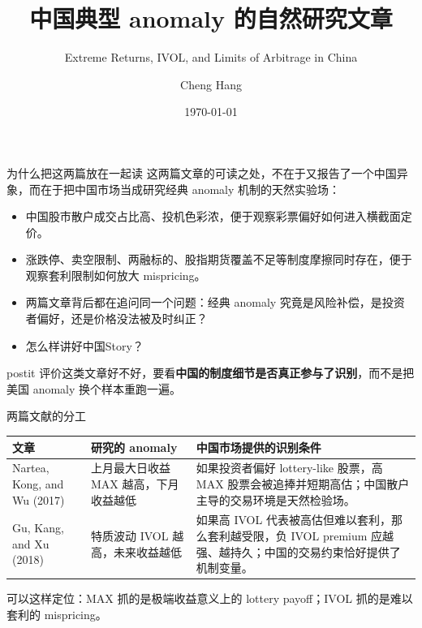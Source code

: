 \documentclass[aspectratio=169,10pt]{beamer}
\title[China Anomaly]{\textbf{中国典型 anomaly 的自然研究文章}}
\subtitle{Extreme Returns, IVOL, and Limits of Arbitrage in China}
\author[Cheng Hang]{Cheng Hang}
\institute[DUFE]{School of Fintech\\Dongbei University of Finance \& Economics}
\date{\today}
\newcommand{\papermax}{Nartea, Kong, and Wu (2017)}
\newcommand{\paperivol}{Gu, Kang, and Xu (2018)}
\newcommand{\tighttable}{\scriptsize\setlength{\tabcolsep}{3pt}\renewcommand{\arraystretch}{1.12}}
\begin{document}
\begin{frame}
	\titlepage
\end{frame}

\begin{frame}{为什么把这两篇放在一起读}
	这两篇文章的可读之处，不在于又报告了一个中国异象，而在于把中国市场当成研究经典 anomaly 机制的天然实验场：
	\begin{itemize}
		\item 中国股市散户成交占比高、投机色彩浓，便于观察彩票偏好如何进入横截面定价。
		\item 涨跌停、卖空限制、两融标的、股指期货覆盖不足等制度摩擦同时存在，便于观察套利限制如何放大 mispricing。
		\item 两篇文章背后都在追问同一个问题：经典 anomaly 究竟是风险补偿，是投资者偏好，还是价格没法被及时纠正？
		\item 怎么样讲好中国Story？
	\end{itemize}
	\vspace{4pt}
	\begin{beamercolorbox}[sep=0.45em,wd=\linewidth,rounded=true]{postit}
		评价这类文章好不好，要看\textbf{中国的制度细节是否真正参与了识别}，而不是把美国 anomaly 换个样本重跑一遍。
	\end{beamercolorbox}


\end{frame}

\begin{frame}{两篇文献的分工}
	\tighttable
	\begin{tabularx}{\textwidth}{lYY}
		\toprule
		文章 & 研究的 anomaly & 中国市场提供的识别条件 \\
		\midrule
		\papermax & 上月最大日收益 MAX 越高，下月收益越低 & 如果投资者偏好 lottery-like 股票，高 MAX 股票会被追捧并短期高估；中国散户主导的交易环境是天然检验场。\\
		\paperivol & 特质波动 IVOL 越高，未来收益越低 & 如果高 IVOL 代表被高估但难以套利，那么套利越受限，负 IVOL premium 应越强、越持久；中国的交易约束恰好提供了机制变量。\\
		\bottomrule
	\end{tabularx}
	\vspace{6pt}
	\begin{center}
		\small 可以这样定位：MAX 抓的是极端收益意义上的 lottery payoff；IVOL 抓的是难以套利的 mispricing。
	\end{center}
\end{frame}
\end{document}
